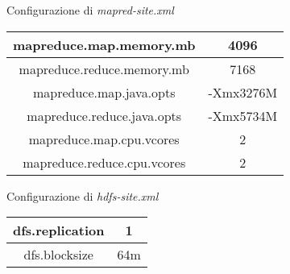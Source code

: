 \begin{center}
Configurazione di \textit{mapred-site.xml}\\
\begin{tabular}{ | c | c |} 
\hline
mapreduce.map.memory.mb & 4096 \\ 
\hline
mapreduce.reduce.memory.mb & 7168 \\ 
\hline
mapreduce.map.java.opts & -Xmx3276M \\
\hline
mapreduce.reduce.java.opts & -Xmx5734M \\ 
\hline
mapreduce.map.cpu.vcores & 2 \\
\hline
mapreduce.reduce.cpu.vcores & 2 \\
\hline
\end{tabular}
\end{center}

\begin{center}
Configurazione di \textit{hdfs-site.xml}\\
\begin{tabular}{ | c | c |} 
\hline
dfs.replication & 1 \\ 
\hline
dfs.blocksize & 64m \\ 
\hline
\end{tabular}
\end{center}